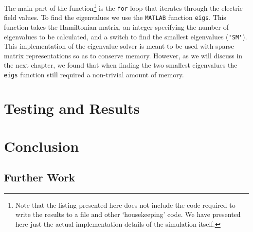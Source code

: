 \documentclass[authoryearcitations]{UoYCSproject}
\begin{document}
The main part of the function\footnote{Note that the listing presented here does not include the code required to write the
results to a file and other `housekeeping' code. We have presented here just the actual implementation details of the 
simulation itself.}  is the \verb+for+ loop that iterates through the electric field values. 
To find the eigenvalues we use the \verb+MATLAB+ function \verb+eigs+. This function takes the 
Hamiltonian matrix, an integer specifying the number of eigenvalues to be calculated, and a switch
to find the smallest eigenvalues (\verb+'SM'+). This implementation of the eigenvalue solver 
is meant to be used with sparse matrix representations so as to conserve memory. However, as we will
discuss in the next chapter, we found that when finding the two smallest eigenvalues the \verb+eigs+ function
still required a non-trivial amount of memory. 

\chapter{Testing and Results}





\chapter{Conclusion}



\section{Further Work}


\end{document}
